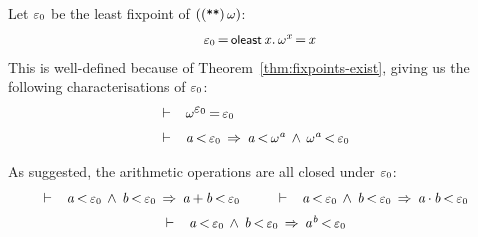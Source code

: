 \documentclass[11pt]{llncs}
\renewcommand{\HOLConst}[1]{{\textsf{\upshape\small #1}}}
\renewcommand{\HOLinline}[1]{\ensuremath{#1}}
\newcommand{\holthmenv}[1]{\begin{array}[t]{l}#1\end{array}}
\newenvironment{holmath}{\begin{displaymath}\begin{array}{l}}{\end{array}\end{displaymath}\ignorespacesafterend}
\begin{document}
\begin{definition}
Let $\HOLinline{\HOLConst{\ensuremath{\varepsilon_0}}}$ be the least fixpoint of $(\HOLinline{(\HOLConst{\HOLTokenExp{}})\,\HOLConst{\ensuremath{\omega}}})$:
\begin{holmath}
\HOLConst{\ensuremath{\varepsilon_0}}\,{\ensuremath{=}}\,\HOLConst{oleast}\,\HOLBoundVar{x}\ensuremath{.}\,\HOLConst{\ensuremath{\omega}}\sp{\HOLBoundVar{x}}\,{\ensuremath{=}}\,\HOLBoundVar{x}
\end{holmath}
This is well-defined because of Theorem~\ref{thm:fixpoints-exist}, giving us the following characterisations of \HOLinline{\HOLConst{\ensuremath{\varepsilon_0}}}:
\[
\begin{array}{l}
\vdash\;\holthmenv{\HOLConst{\ensuremath{\omega}}\sp{\HOLConst{\ensuremath{\varepsilon_0}}}\,{\ensuremath{=}}\,\HOLConst{\ensuremath{\varepsilon_0}}}\\[2mm]
\vdash\;\holthmenv{\HOLFreeVar{a}\,\ensuremath{{<}}\,\HOLConst{\ensuremath{\varepsilon_0}}\,\HOLTokenImp{}\,\HOLFreeVar{a}\,\ensuremath{{<}}\,\HOLConst{\ensuremath{\omega}}\sp{\HOLFreeVar{a}}\,\HOLTokenConj{}\,\HOLConst{\ensuremath{\omega}}\sp{\HOLFreeVar{a}}\,\ensuremath{{<}}\,\HOLConst{\ensuremath{\varepsilon_0}}}
\end{array}
\]
\end{definition}

\begin{theorem}
As suggested, the arithmetic operations are all closed under \HOLinline{\HOLConst{\ensuremath{\varepsilon_0}}}:
\[
\begin{array}{c}
\vdash \;\holthmenv{\HOLFreeVar{a}\,\ensuremath{{<}}\,\HOLConst{\ensuremath{\varepsilon_0}}\,\HOLTokenConj{}\,\HOLFreeVar{b}\,\ensuremath{{<}}\,\HOLConst{\ensuremath{\varepsilon_0}}\,\HOLTokenImp{}\,\HOLFreeVar{a}\,\ensuremath{{+}}\,\HOLFreeVar{b}\,\ensuremath{{<}}\,\HOLConst{\ensuremath{\varepsilon_0}}} \qquad
\vdash \;\holthmenv{\HOLFreeVar{a}\,\ensuremath{{<}}\,\HOLConst{\ensuremath{\varepsilon_0}}\,\HOLTokenConj{}\,\HOLFreeVar{b}\,\ensuremath{{<}}\,\HOLConst{\ensuremath{\varepsilon_0}}\,\HOLTokenImp{}\,\HOLFreeVar{a}\,\ensuremath{{\cdot}}\,\HOLFreeVar{b}\,\ensuremath{{<}}\,\HOLConst{\ensuremath{\varepsilon_0}}}\\[2mm]
\vdash \;\holthmenv{\HOLFreeVar{a}\,\ensuremath{{<}}\,\HOLConst{\ensuremath{\varepsilon_0}}\,\HOLTokenConj{}\,\HOLFreeVar{b}\,\ensuremath{{<}}\,\HOLConst{\ensuremath{\varepsilon_0}}\,\HOLTokenImp{}\,\HOLFreeVar{a}\sp{\HOLFreeVar{b}}\,\ensuremath{{<}}\,\HOLConst{\ensuremath{\varepsilon_0}}}
\end{array}
\]
\end{theorem}
\end{document}
